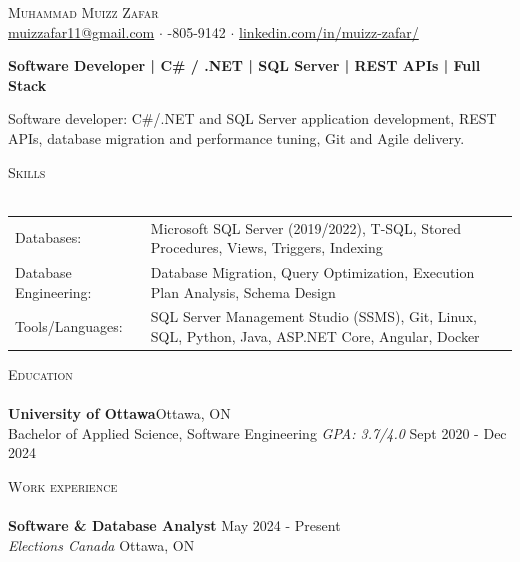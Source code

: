 \documentclass[a4paper]{article}
\newcommand{\lineunder} {
    \vspace*{-8pt} \\
    \hspace*{-18pt} \hrulefill \\
}
\newcommand{\header} [1] {
    {\hspace*{-18pt}\vspace*{6pt} \textsc{#1}}
    \vspace*{-6pt} \lineunder
}
\begin{document}
\vspace*{-40pt}
\vspace*{-10pt}
\begin{center}
	{\Huge \scshape {Muhammad Muizz Zafar}}\\
	\faSend \space \href{mailto:muizzafar11@gmail.com}{muizzafar11@gmail.com} $\cdot$ \faPhoneSquare {}-805-9142 $\cdot$ \faLinkedinSquare \space \href{https://www.linkedin.com/in/muizz-zafar/}{linkedin.com/in/muizz-zafar/}
	\\
\end{center}
\vspace{-5pt}
\begin{center}
\textbf{Software Developer | C\# / .NET | SQL Server | REST APIs | Full Stack}
\end{center}
\begin{center}
Software developer: C\#/.NET and SQL Server application development, REST APIs, database migration and performance tuning, Git and Agile delivery.
\end{center}
\header{Skills}
\begin{tabular}{ l l }
Databases: & Microsoft SQL Server (2019/2022), T-SQL, Stored Procedures, Views, Triggers, Indexing \\
Database Engineering: & Database Migration, Query Optimization, Execution Plan Analysis, Schema Design \\
Tools/Languages: & SQL Server Management Studio (SSMS), Git, Linux, SQL, Python, Java, ASP.NET Core, Angular, Docker \\
\end{tabular}
\vspace{2mm}
\header{Education}
\textbf{University of Ottawa}\hfill Ottawa, ON\\
Bachelor of Applied Science, Software Engineering \textit{GPA: 3.7/4.0} \hfill Sept 2020 - Dec 2024\\
\vspace{2mm}
\header{Work experience}
\vspace{1.5mm}
\textbf{Software \& Database Analyst} \hfill May 2024 - Present\\
\textit{Elections Canada} \hfill Ottawa, ON\\
\vspace{-2mm}
\end{document}
